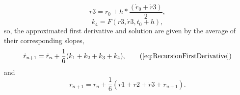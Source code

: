 \documentclass[12pt]{article}
\begin{document}
\begin{equation}
  \label{eq:Sol_2}
  r3 = r_{0} + h*\frac{(\dot{r}_{0}+\dot{r}3)}{2},
\end{equation}
\begin{equation}
  \label{eq:slope4}
  k_{4}= F(r3,\dot{r}3,t_{0}+h),
\end{equation}
so, the approximated first derivative and solution are given by the
average of their corresponding slopes,
\begin{equation}
  \dot{r}_{n+1} = \dot{r}_{n} + \frac{1}{6}(k_{1}+k_{2}+k_{3}+k_{4}), \tag{\ref{eq:RecursionFirstDerivative}}
\end{equation}
and
\begin{equation}
   \label{eq:SODE_Sol}
  r_{n+1} = r_{n} + \frac{1}{6}(\dot{r}1+\dot{r}2+\dot{r}3+\dot{r}_{n+1}).
\end{equation}
\end{document}
